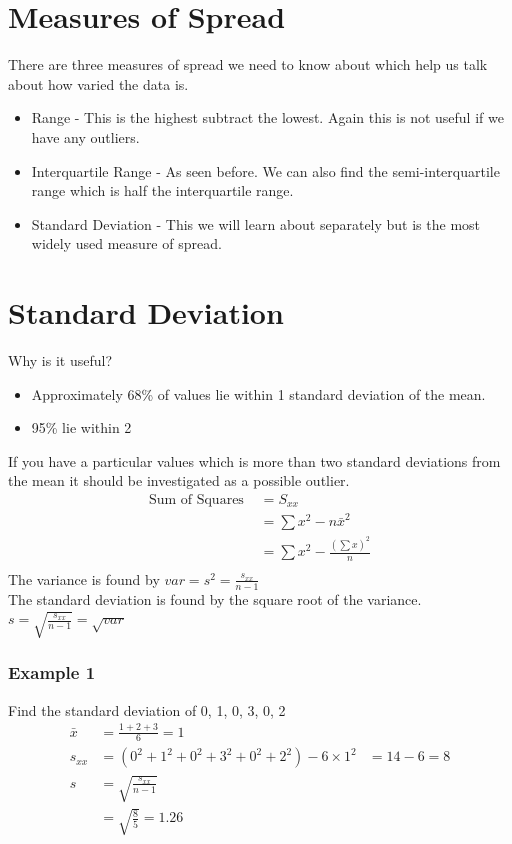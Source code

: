 \documentclass[a4paper,12pt]{article}
\begin{document}
\section*{Measures of Spread}
There are three measures of spread we need to know about which help us talk about how varied the data is.
\begin{itemize}
	\item Range - This is the highest subtract the lowest. Again this is not useful if we have any outliers.
	\item Interquartile Range - As seen before. We can also find the semi-interquartile range which is half the interquartile range.
	\item Standard Deviation - This we will learn about separately but is the most widely used measure of spread.   
\end{itemize}

\section*{Standard Deviation}
Why is it useful?
\begin{itemize}
	\item Approximately 68\% of values lie within 1 standard deviation of the mean. 
	\item 95\% lie within 2
\end{itemize}
If you have a particular values which is more than two standard deviations from the mean it should be investigated as a possible outlier. \\
\begin{align*}
\text{Sum of Squares } & = S_{xx} \\ 
& = \sum x^2 - n\bar{x}^2 \\
& = \sum x^2 - \frac{(\sum x)^2}{n} \\
\end{align*}
The variance is found by $var = s^2 = \frac{s_{xx}}{n-1}$ \\
The standard deviation is found by the square root of the variance. \\
$s = \sqrt{\frac{s_{xx}}{n-1}} = \sqrt{var}$

\subsubsection*{Example 1}
Find the standard deviation of 0, 1, 0, 3, 0, 2
\begin{align*}
\bar{x} & = \frac{1 + 2 + 3}{6} = 1 \\
s_{xx} & = (0^2 + 1^2 + 0^2 + 3^2 + 0^2 + 2^2) - 6 \times 1^2
& = 14-6 = 8 \\
s & = \sqrt{\frac{s_{xx}}{n-1}} \\
& = \sqrt{\frac{8}{5}} = 1.26 \\
\end{align*}
\end{document}
